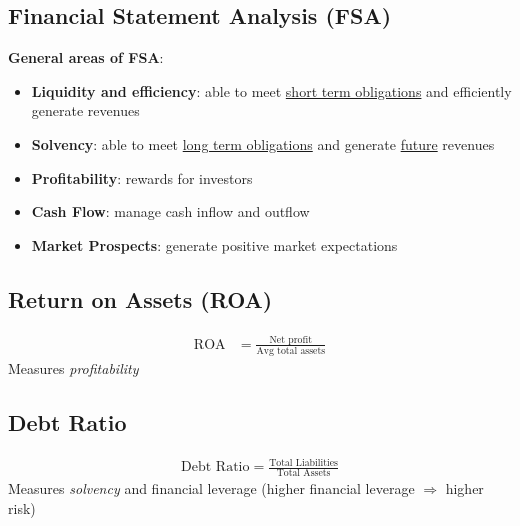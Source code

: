 \documentclass{article}
\begin{document}
\begin{multicols}{2}
\section{Financial Statement Analysis (FSA)}
\textbf{General areas of FSA}:
\begin{itemize}
	\item \textbf{Liquidity and efficiency}: able to meet \underline{short term obligations} and efficiently generate revenues
	\item \textbf{Solvency}: able to meet \underline{long term obligations} and generate \underline{future} revenues
	\item \textbf{Profitability}: rewards for investors
	\item \textbf{Cash Flow}: manage cash inflow and outflow
	\item \textbf{Market Prospects}: generate positive market expectations
\end{itemize}

\subsection{Return on Assets (ROA)}
\begin{equation*}
	\begin{aligned}
		\text{ROA} &= \frac{\text{Net profit}}{\text{Avg total assets}}
	\end{aligned}
\end{equation*}
Measures \textit{profitability}
\subsection{Debt Ratio}
\begin{equation*}
	\begin{aligned}
		\text{Debt Ratio} = \frac{\text{Total Liabilities}}{\text{Total Assets}}
	\end{aligned}
\end{equation*}
Measures \textit{solvency} and financial leverage (higher financial leverage $\Rightarrow$ higher risk)
\end{multicols}
\end{document}
